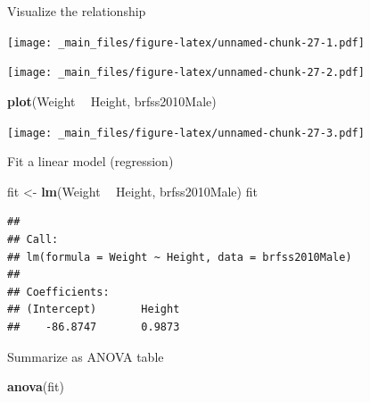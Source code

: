 \documentclass[]{article}
\newenvironment{Shaded}{\begin{snugshade}}{\end{snugshade}}
\newcommand{\KeywordTok}[1]{\textcolor[rgb]{0.13,0.29,0.53}{\textbf{#1}}}
\newcommand{\StringTok}[1]{\textcolor[rgb]{0.31,0.60,0.02}{#1}}
\newcommand{\OperatorTok}[1]{\textcolor[rgb]{0.81,0.36,0.00}{\textbf{#1}}}
\newcommand{\NormalTok}[1]{#1}
\theoremstyle{definition}
\theoremstyle{definition}
\theoremstyle{remark}
\begin{document}
Visualize the relationship

\begin{Shaded}
\end{Shaded}

\texttt{[image: \_main\_files/figure-latex/unnamed-chunk-27-1.pdf]}

\begin{Shaded}
\end{Shaded}

\texttt{[image: \_main\_files/figure-latex/unnamed-chunk-27-2.pdf]}

\begin{Shaded}
\begin{Highlighting}[]
\KeywordTok{plot}\NormalTok{(Weight }\OperatorTok{~}\StringTok{ }\NormalTok{Height, brfss2010Male)}
\end{Highlighting}
\end{Shaded}

\texttt{[image: \_main\_files/figure-latex/unnamed-chunk-27-3.pdf]}

Fit a linear model (regression)

\begin{Shaded}
\begin{Highlighting}[]
\NormalTok{fit <-}\StringTok{ }\KeywordTok{lm}\NormalTok{(Weight }\OperatorTok{~}\StringTok{ }\NormalTok{Height, brfss2010Male)}
\NormalTok{fit}
\end{Highlighting}
\end{Shaded}

\begin{verbatim}
## 
## Call:
## lm(formula = Weight ~ Height, data = brfss2010Male)
## 
## Coefficients:
## (Intercept)       Height  
##    -86.8747       0.9873
\end{verbatim}

Summarize as ANOVA table

\begin{Shaded}
\begin{Highlighting}[]
\KeywordTok{anova}\NormalTok{(fit)}
\end{Highlighting}
\end{Shaded}
\end{document}

